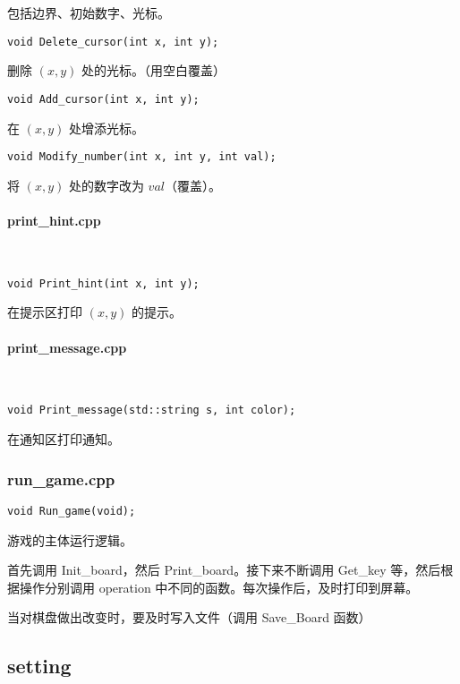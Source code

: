 \documentclass{article}
\newcommand{\subsubsubsection}[1]{\paragraph{#1}\mbox{}\\}
\begin{document}
    包括边界、初始数字、光标。

    \begin{lstlisting}
void Delete_cursor(int x, int y);
    \end{lstlisting}
    
    删除 $(x, y)$ 处的光标。（用空白覆盖）

    \begin{lstlisting}
void Add_cursor(int x, int y);
    \end{lstlisting}

    在 $(x, y)$ 处增添光标。

    \begin{lstlisting}
void Modify_number(int x, int y, int val);
    \end{lstlisting}

    将 $(x, y)$ 处的数字改为 $val$（覆盖）。
    
    \subsubsubsection{print\_hint.cpp}

    \begin{lstlisting}
void Print_hint(int x, int y);
    \end{lstlisting}

    在提示区打印 $(x, y)$ 的提示。

    \subsubsubsection{print\_message.cpp}

    \begin{lstlisting}
void Print_message(std::string s, int color);
    \end{lstlisting}
    
    在通知区打印通知。

    \subsubsection{run\_game.cpp}

    \begin{lstlisting}
void Run_game(void);
    \end{lstlisting}

    游戏的主体运行逻辑。
    
    首先调用 Init\_board，然后 Print\_board。接下来不断调用 Get\_key 等，然后根据操作分别调用 operation 中不同的函数。每次操作后，及时打印到屏幕。

    当对棋盘做出改变时，要及时写入文件（调用 Save\_Board 函数）

    \subsection{setting}
\end{document}
